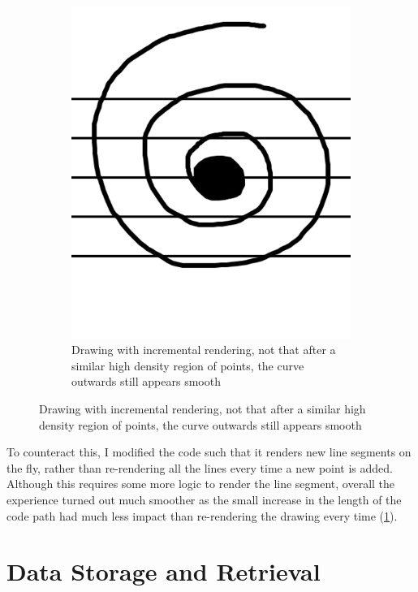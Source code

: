 \begin{figure}[hbt                                   ]
\begin{subfigure}[b]{.49\linewidth}
      \includegraphics[width=\linewidth]{gfx/implementation/nolag-stave.png}
      \caption{Drawing with incremental rendering, not that after a similar high density region of points, the curve outwards still appears smooth}
      \label{fig:drawing-lag-smooth}
    \end{subfigure}

  \label{Drawing Lag}

\end{figure}

To counteract this, I modified the code such that it renders new line segments on the fly, rather than re-rendering all the lines every time a new point is added. Although this requires some more logic to render the line segment, overall the experience turned out much smoother as the small increase in the length of the code path had much less impact than re-rendering the drawing every time (\cref{fig:drawing-lag-smooth}).

\section{Data Storage and Retrieval}

